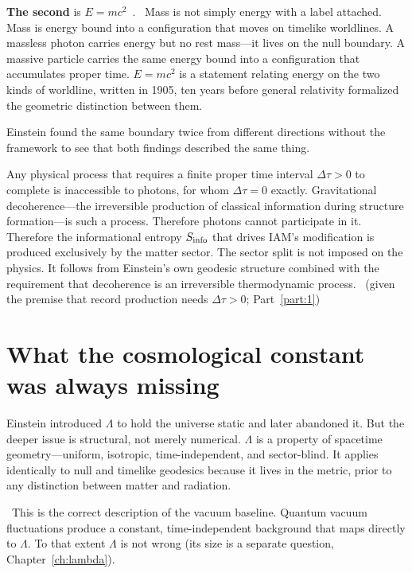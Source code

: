 \textbf{The second} is $E=mc^2$~\cite{Einstein1905}. \interp\ Mass is not simply energy with a label attached. Mass is energy bound into a configuration
that moves on timelike worldlines. A massless photon carries energy but no rest mass---it lives on the null boundary. A massive particle carries the same
energy bound into a configuration that accumulates proper time. $E=mc^2$ is a statement relating energy on the two kinds of worldline, written in 1905,
ten years before general relativity formalized the geometric distinction between them.

Einstein found the same boundary twice from different directions without the framework to see that both findings described the same thing.

\begin{keybox}[title={The core claim of IAM's sector split, stated plainly}]
Any physical process that requires a finite proper time interval $\Delta\tau>0$ to complete is inaccessible to photons, for whom $\Delta\tau=0$ exactly.
Gravitational decoherence---the irreversible production of classical information during structure formation---is such a process. Therefore photons
cannot participate in it. Therefore the informational entropy $S_{\rm info}$ that drives IAM's modification is produced exclusively by the matter sector.
The sector split is not imposed on the physics. It follows from Einstein's own geodesic structure combined with the requirement that decoherence is an
irreversible thermodynamic process. \derived\ (given the premise that record production needs $\Delta\tau>0$; Part~\ref{part:1})
\end{keybox}

\section{What the cosmological constant was always missing}\label{sec:dsn_lambda}
Einstein introduced $\Lambda$ to hold the universe static and later abandoned it. But the deeper issue is structural, not merely numerical. $\Lambda$ is a
property of spacetime geometry---uniform, isotropic, time-independent, and sector-blind. It applies identically to null and timelike geodesics because it
lives in the metric, prior to any distinction between matter and radiation.

\interp\ This is the correct description of the vacuum baseline. Quantum vacuum fluctuations produce a constant, time-independent background that maps
directly to $\Lambda$. To that extent $\Lambda$ is not wrong (its size is a separate question, Chapter~\ref{ch:lambda}).

